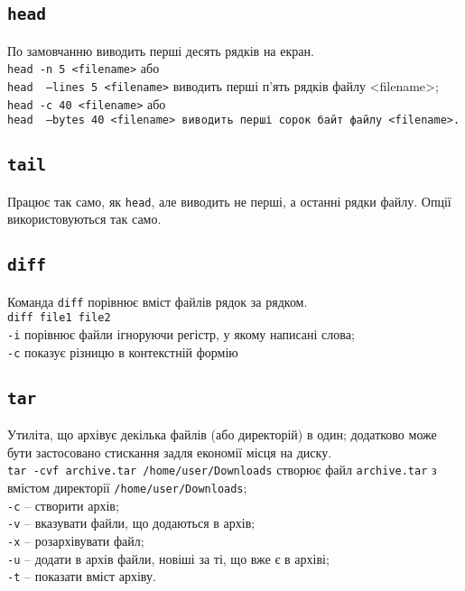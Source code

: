 \documentclass[10pt,a4paper]{fancyhandout}
\begin{document}
\subsection{\texttt{head}}
По замовчанню виводить перші десять рядків на екран. \\
\texttt{head -n 5 <filename>} або \\ \texttt{head ~---lines 5 <filename>} виводить перші п'ять рядків файлу <filename>; \\
\texttt{head -c 40 <filename>} або \\ \texttt{head ~---bytes 40 <filename> виводить перші сорок байт файлу <filename>.}
\goodbreak

\subsection{\texttt{tail}}
Працює так само, як \texttt{head}, але виводить не перші, а останні рядки файлу. Опції використовуються так само.
\goodbreak

\subsection{\texttt{diff}}
Команда \texttt{diff} порівнює вміст файлів рядок за рядком. \\
\texttt{diff file1 file2} \\
\texttt{-i} порівнює файли ігноруючи регістр, у якому написані слова; \\
\texttt{-c} показує різницю в контекстній формію
\goodbreak

\subsection{\texttt{tar}}
Утиліта, що архівує декілька файлів (або директорій) в один; додатково може бути застосовано стискання задля економії місця на диску. \\
\texttt{tar -cvf archive.tar /home/user/Downloads} створює файл \texttt{archive.tar} з вмістом директорії \texttt{/home/user/Downloads}; \\
\texttt{-c} -- створити архів; \\
\texttt{-v} -- вказувати файли, що додаються в архів; \\
\texttt{-x} -- розархівувати файл; \\
\texttt{-u} -- додати в архів файли, новіші за ті, що вже є в архіві; \\
\texttt{-t} -- показати вміст архіву.
\goodbreak
\end{document}
